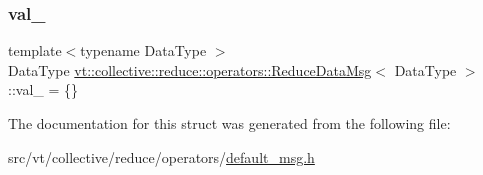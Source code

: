 \mbox{\label{structvt_1_1collective_1_1reduce_1_1operators_1_1_reduce_data_msg_a3d393a0bf3245aeac348b66be4e566f9}} 
\subsubsection{\texorpdfstring{val\+\_\+}{val\_}}
{\footnotesize\ttfamily template$<$typename Data\+Type $>$ \\
Data\+Type \hyperlink{structvt_1_1collective_1_1reduce_1_1operators_1_1_reduce_data_msg}{vt\+::collective\+::reduce\+::operators\+::\+Reduce\+Data\+Msg}$<$ Data\+Type $>$\+::val\+\_\+ = \{\}\hspace{0.3cm}{\ttfamily [protected]}}



The documentation for this struct was generated from the following file\+:\begin{DoxyCompactItemize}
\item 
src/vt/collective/reduce/operators/\hyperlink{default__msg_8h}{default\+\_\+msg.\+h}\end{DoxyCompactItemize}

